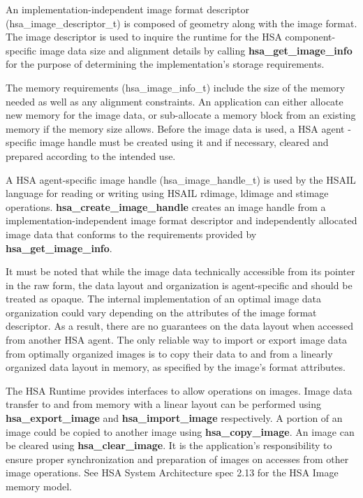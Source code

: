 \documentclass{book}
\newcommand{\reffun}[1]{\textbf{#1}}
\newcommand{\reftyp}[1]{#1}
\begin{document}
\begin{appendices}
An implementation-independent image format descriptor
(\reftyp{hsa\_image\_descriptor\_t}) is composed of geometry along with
the image format. The image descriptor is used to inquire the runtime
for the HSA component-specific image data size and alignment details
by calling \reffun{hsa\_get\_image\_info} for the purpose of determining
the implementation’s storage requirements.

The memory requirements (\reftyp{hsa\_image\_info\_t}) include the size
of the memory needed as well as any alignment constraints. An
application can either allocate new memory for the image data, or
sub-allocate a memory block from an existing memory if the memory size
allows. Before the image data is used, a HSA agent -specific image
handle must be created using it and if necessary, cleared and prepared
according to the intended use.

A HSA agent-specific image handle (\reftyp{hsa\_image\_handle\_t}) is
used by the HSAIL language for reading or writing using HSAIL rdimage,
ldimage and stimage operations. \reffun{hsa\_create\_image\_handle}
creates an image handle from a implementation-independent image format
descriptor and independently allocated image data that conforms to the
requirements provided by \reffun{hsa\_get\_image\_info}.

It must be noted that while the image data technically accessible from
its pointer in the raw form, the data layout and organization is
agent-specific and should be treated as opaque. The internal
implementation of an optimal image data organization could vary
depending on the attributes of the image format descriptor. As a
result, there are no guarantees on the data layout when accessed from
another HSA agent. The only reliable way to import or export image
data from optimally organized images is to copy their data to and from
a linearly organized data layout in memory, as specified by the
image’s format attributes.

The HSA Runtime provides interfaces to allow operations on
images. Image data transfer to and from memory with a linear layout
can be performed using \reffun{hsa\_export\_image} and
\reffun{hsa\_import\_image} respectively. A portion of an image could be
copied to another image using \reffun{hsa\_copy\_image}. An image can be
cleared using \reffun{hsa\_clear\_image}. It is the application’s
responsibility to ensure proper synchronization and preparation of
images on accesses from other image operations. See HSA System
Architecture spec 2.13 for the HSA Image memory model.


\end{appendices}
\end{document}
